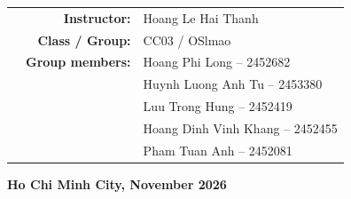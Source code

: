 \begin{titlepage}
\vspace{0.8cm}
\begin{tabular}{rrl}
    \vspace{0.5cm}
    \hspace{0.5cm} & \large \textbf{Instructor:} & \large Hoang Le Hai Thanh\\
    \vspace{0.3cm}
    \hspace{0.5cm} & \large \textbf{Class / Group:} & \large CC03 / OSlmao\\
    \vspace{0.3cm}
    & \large \textbf{Group members:} & \large Hoang Phi Long -- 2452682 \\ \vspace{0.3cm}
    & & \large Huynh Luong Anh Tu -- 2453380 \\ \vspace{0.3cm}
    & & \large Luu Trong Hung -- 2452419 \\ \vspace{0.3cm}
    & & \large Hoang Dinh Vinh Khang -- 2452455 \\ \vspace{0.3cm}
    & & \large Pham Tuan Anh -- 2452081 \\
\end{tabular}

\vspace{1cm}
\begin{center}
    \textbf{\large Ho Chi Minh City, November 2026}
\end{center}
\end{titlepage}
\newpage
\tableofcontents
